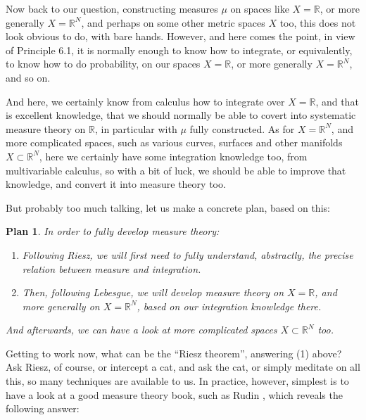 \documentclass[12pt]{amsbook}
\newtheorem{plan}[theorem]{Plan}
\begin{document}
Now back to our question, constructing measures $\mu$ on spaces like $X=\mathbb R$, or more generally $X=\mathbb R^N$, and perhaps on some other metric spaces $X$ too, this does not look obvious to do, with bare hands. However, and here comes the point, in view of Principle 6.1, it is normally enough to know how to integrate, or equivalently, to know how to do probability, on our spaces $X=\mathbb R$, or more generally $X=\mathbb R^N$, and so on.

\bigskip

And here, we certainly know from calculus how to integrate over $X=\mathbb R$, and that is excellent knowledge, that we should normally be able to covert into systematic measure theory on $\mathbb R$, in particular with $\mu$ fully constructed. As for $X=\mathbb R^N$, and more complicated spaces, such as various curves, surfaces and other manifolds $X\subset\mathbb R^N$, here we certainly have some integration knowledge too, from multivariable calculus, so with a bit of luck, we should be able to improve that knowledge, and convert it into measure theory too.

\bigskip

But probably too much talking, let us make a concrete plan, based on this:

\begin{plan}
In order to fully develop measure theory:
\begin{enumerate}
\item Following Riesz, we will first need to fully understand, abstractly, the precise relation between measure and integration.

\item Then, following Lebesgue, we will develop measure theory on $X=\mathbb R$, and more generally on $X=\mathbb R^N$, based on our integration knowledge there.
\end{enumerate}
And afterwards, we can have a look at more complicated spaces $X\subset\mathbb R^N$ too.
\end{plan}

Getting to work now, what can be the ``Riesz theorem'', answering (1) above? Ask Riesz, of course, or intercept a cat, and ask the cat, or simply meditate on all this, so many techniques are available to us. In practice, however, simplest is to have a look at a good measure theory book, such as Rudin \cite{ru2}, which reveals the following answer:
\end{document}
